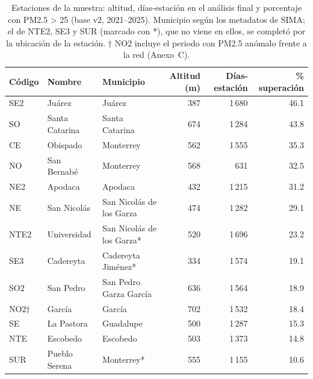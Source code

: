 \begin{table}[H]
\centering\small
\caption{Estaciones de la muestra: altitud, días-estación en el análisis final y porcentaje con PM2.5 > 25\ugm{} (base v2, 2021–2025). Municipio según los metadatos de SIMA; el de NTE2, SE3 y SUR (marcado con *), que no viene en ellos, se completó por la ubicación de la estación. † NO2 incluye el periodo con PM2.5 anómalo frente a la red (Anexo~C).}
\label{tbl:estaciones}
\begin{tabular}{lllrrr}
\toprule
Código & Nombre & Municipio & Altitud (m) & Días-estación & \% superación\\
\midrule
SE2 & Juárez & Juárez & 387 & 1\,680 & 46.1\\
SO & Santa Catarina & Santa Catarina & 674 & 1\,284 & 43.8\\
CE & Obispado & Monterrey & 562 & 1\,555 & 35.3\\
NO & San Bernabé & Monterrey & 568 & 631 & 32.5\\
NE2 & Apodaca & Apodaca & 432 & 1\,215 & 31.2\\
NE & San Nicolás & San Nicolás de los Garza & 474 & 1\,282 & 29.1\\
NTE2 & Universidad & San Nicolás de los Garza* & 520 & 1\,696 & 23.2\\
SE3 & Cadereyta & Cadereyta Jiménez* & 334 & 1\,574 & 19.1\\
SO2 & San Pedro & San Pedro Garza García & 636 & 1\,564 & 18.9\\
NO2† & García & García & 702 & 1\,532 & 18.4\\
SE & La Pastora & Guadalupe & 500 & 1\,287 & 15.3\\
NTE & Escobedo & Escobedo & 503 & 1\,373 & 14.8\\
SUR & Pueblo Serena & Monterrey* & 555 & 1\,155 & 10.6\\
\bottomrule
\end{tabular}
\end{table}

